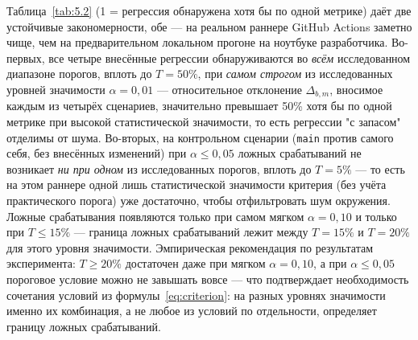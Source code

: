 Таблица~\ref{tab:5.2} (1 = регрессия обнаружена хотя бы по одной метрике)
даёт две устойчивые закономерности, обе — на реальном раннере GitHub Actions
заметно чище, чем на предварительном локальном прогоне на ноутбуке
разработчика. Во-первых, все четыре внесённые регрессии обнаруживаются во
\emph{всём} исследованном диапазоне порогов, вплоть до $T=50\%$, при
\emph{самом строгом} из исследованных уровней значимости $\alpha=0{,}01$ —
относительное отклонение $\Delta_{b,m}$, вносимое каждым из четырёх
сценариев, значительно превышает 50\% хотя бы по одной метрике при высокой
статистической значимости, то есть регрессии "с запасом" отделимы от шума.
Во-вторых, на контрольном сценарии (\texttt{main} против самого себя, без
внесённых изменений) при $\alpha \le 0{,}05$ ложных срабатываний не
возникает \emph{ни при одном} из исследованных порогов, вплоть до
$T=5\%$ — то есть на этом раннере одной лишь статистической значимости
критерия (без учёта практического порога) уже достаточно, чтобы отфильтровать
шум окружения. Ложные срабатывания появляются только при самом мягком
$\alpha=0{,}10$ и только при $T \le 15\%$ — граница ложных срабатываний
лежит между $T=15\%$ и $T=20\%$ для этого уровня значимости. Эмпирическая
рекомендация по результатам эксперимента: $T \ge 20\%$ достаточен даже при
мягком $\alpha=0{,}10$, а при $\alpha \le 0{,}05$ пороговое условие можно не
завышать вовсе — что подтверждает необходимость сочетания условий из
формулы~\eqref{eq:criterion}: на разных уровнях значимости именно их
комбинация, а не любое из условий по отдельности, определяет границу
ложных срабатываний.

